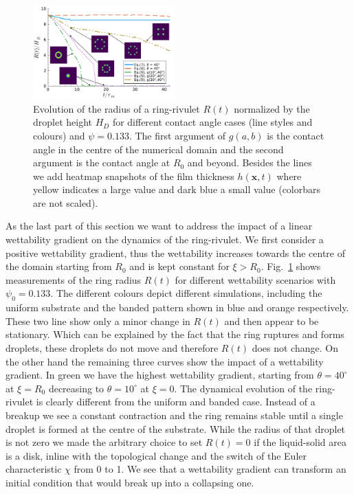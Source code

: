 \documentclass[twoside,twocolumn,9pt]{article}
\begin{document}
\begin{figure}
    \centering
    \includegraphics[width=0.48\textwidth]{assets/grad_heatmap.pdf}
    \caption{Evolution of the radius of a ring-rivulet $R(t)$ normalized by the droplet height $H_D$ for different contact angle cases (line styles and colours) and $\psi = 0.133$.
    The first argument of $g(a,b)$ is the contact angle in the centre of the numerical domain and the second argument is the contact angle at $R_0$ and beyond. 
    Besides the lines we add heatmap snapshots of the film thickness $h(\mathbf{x},t)$ where yellow indicates a large value and dark blue a small value (colorbars are not scaled).}
    \label{fig:negativewetgrad}
\end{figure}
As the last part of this section we want to address the impact of a linear wettability gradient on the dynamics of the ring-rivulet. 
We first consider a positive wettability gradient, thus the wettability increases towards the centre of the domain starting from $R_0$ and is kept constant for $\xi > R_0$.
Fig.~\ref{fig:negativewetgrad} shows measurements of the ring radius $R(t)$ for different wettability scenarios with $\psi_0 = 0.133$.
The different colours depict different simulations, including the uniform substrate and the banded pattern shown in blue and orange respectively.
These two line show only a minor change in $R(t)$ and then appear to be stationary.
Which can be explained by the fact that the ring ruptures and forms droplets, these droplets do not move and therefore $R(t)$ does not change.
On the other hand the remaining three curves show the impact of a wettability gradient.  
In green we have the highest wettability gradient, starting from $\theta = 40^{\circ}$ at $\xi = R_0$ decreasing to $\theta = 10^{\circ}$ at $\xi = 0$. 
The dynamical evolution of the ring-rivulet is clearly different from the uniform and banded case.
Instead of a breakup we see a constant contraction and the ring remains stable until a single droplet is formed at the centre of the substrate.
While the radius of that droplet is not zero we made the arbitrary choice to set $R(t) = 0$ if the liquid-solid area is a disk, inline with the topological change and the switch of the Euler characteristic $\chi$ from 0 to 1.
We see that a wettability gradient can transform an initial condition that would break up into a collapsing one.
\end{document}

